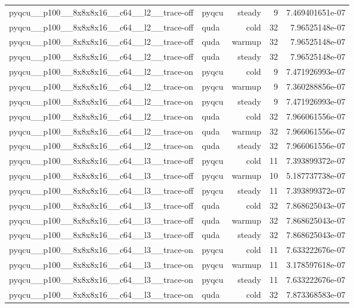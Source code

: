 \begin{table}[htbp]
\begin{tabular}{@{}llrrr@{}}
pyqcu\_\_p100\_\_8x8x8x16\_\_c64\_\_l2\_\_trace-off & pyqcu & steady & 9 & 7.469401651e-07 \\
pyqcu\_\_p100\_\_8x8x8x16\_\_c64\_\_l2\_\_trace-off & quda & cold & 32 & 7.96525148e-07 \\
pyqcu\_\_p100\_\_8x8x8x16\_\_c64\_\_l2\_\_trace-off & quda & warmup & 32 & 7.96525148e-07 \\
pyqcu\_\_p100\_\_8x8x8x16\_\_c64\_\_l2\_\_trace-off & quda & steady & 32 & 7.96525148e-07 \\
pyqcu\_\_p100\_\_8x8x8x16\_\_c64\_\_l2\_\_trace-on & pyqcu & cold & 9 & 7.471926993e-07 \\
pyqcu\_\_p100\_\_8x8x8x16\_\_c64\_\_l2\_\_trace-on & pyqcu & warmup & 9 & 7.360288856e-07 \\
pyqcu\_\_p100\_\_8x8x8x16\_\_c64\_\_l2\_\_trace-on & pyqcu & steady & 9 & 7.471926993e-07 \\
pyqcu\_\_p100\_\_8x8x8x16\_\_c64\_\_l2\_\_trace-on & quda & cold & 32 & 7.966061556e-07 \\
pyqcu\_\_p100\_\_8x8x8x16\_\_c64\_\_l2\_\_trace-on & quda & warmup & 32 & 7.966061556e-07 \\
pyqcu\_\_p100\_\_8x8x8x16\_\_c64\_\_l2\_\_trace-on & quda & steady & 32 & 7.966061556e-07 \\
pyqcu\_\_p100\_\_8x8x8x16\_\_c64\_\_l3\_\_trace-off & pyqcu & cold & 11 & 7.393899372e-07 \\
pyqcu\_\_p100\_\_8x8x8x16\_\_c64\_\_l3\_\_trace-off & pyqcu & warmup & 10 & 5.187737738e-07 \\
pyqcu\_\_p100\_\_8x8x8x16\_\_c64\_\_l3\_\_trace-off & pyqcu & steady & 11 & 7.393899372e-07 \\
pyqcu\_\_p100\_\_8x8x8x16\_\_c64\_\_l3\_\_trace-off & quda & cold & 32 & 7.868625043e-07 \\
pyqcu\_\_p100\_\_8x8x8x16\_\_c64\_\_l3\_\_trace-off & quda & warmup & 32 & 7.868625043e-07 \\
pyqcu\_\_p100\_\_8x8x8x16\_\_c64\_\_l3\_\_trace-off & quda & steady & 32 & 7.868625043e-07 \\
pyqcu\_\_p100\_\_8x8x8x16\_\_c64\_\_l3\_\_trace-on & pyqcu & cold & 11 & 7.633222676e-07 \\
pyqcu\_\_p100\_\_8x8x8x16\_\_c64\_\_l3\_\_trace-on & pyqcu & warmup & 11 & 3.178597618e-07 \\
pyqcu\_\_p100\_\_8x8x8x16\_\_c64\_\_l3\_\_trace-on & pyqcu & steady & 11 & 7.633222676e-07 \\
pyqcu\_\_p100\_\_8x8x8x16\_\_c64\_\_l3\_\_trace-on & quda & cold & 32 & 7.873368583e-07 \\

\end{tabular}
\end{table}
